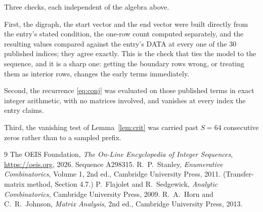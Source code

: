 \documentclass[11pt,a4paper]{article}
\theoremstyle{plain}
\theoremstyle{definition}
\begin{document}
Three checks, each independent of the algebra above.

First, the digraph, the start vector and the end vector were built directly from the
entry's stated condition, the one-row count computed separately, and the resulting values
compared against the entry's DATA at every one of the $30$ published indices; they
agree exactly. This is the check that ties the model to the sequence, and it is a sharp one:
getting the boundary rows wrong, or treating them as interior rows, changes the early terms
immediately.

Second, the recurrence \eqref{eq:conj} was evaluated on those published terms in exact
integer arithmetic, with no matrices involved, and vanishes at every index the entry claims.

Third, the vanishing test of Lemma~\ref{lem:crit} was carried past $S=64$ consecutive
zeros rather than to a sampled prefix.

\begin{thebibliography}{9}
 The OEIS Foundation, \emph{The On-Line Encyclopedia of Integer
Sequences}, \url{https://oeis.org}, 2026. Sequence A298315.
 R.~P.~Stanley, \emph{Enumerative Combinatorics}, Volume 1, 2nd ed.,
Cambridge University Press, 2011. (Transfer-matrix method, Section 4.7.)
 P.~Flajolet and R.~Sedgewick, \emph{Analytic Combinatorics}, Cambridge
University Press, 2009.
 R.~A.~Horn and C.~R.~Johnson, \emph{Matrix Analysis}, 2nd ed., Cambridge
University Press, 2013.
\end{thebibliography}
\end{document}
